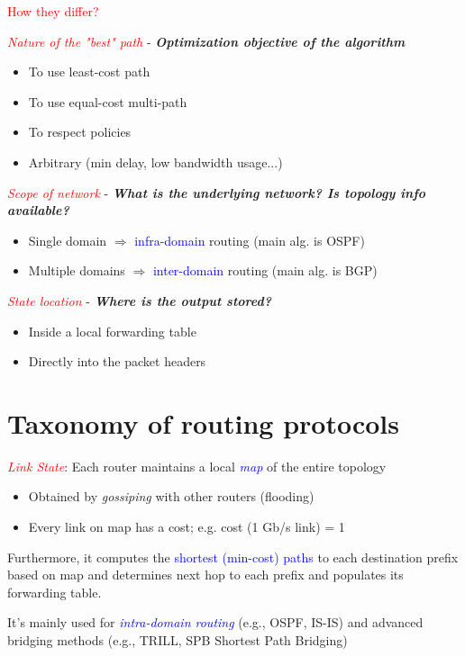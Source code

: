 \documentclass[11pt]{article}
\begin{document}
\textcolor{red}{How they differ?}

\textcolor{red}{\textit{Nature of the "best" path}} - \textbf{\textit{Optimization objective of the algorithm}}
\begin{itemize}
	\item To use least-cost path
	\item To use equal-cost multi-path
	\item To respect policies
	\item Arbitrary (min delay, low bandwidth usage...)
\end{itemize}

\textcolor{red}{\textit{Scope of network}} - \textbf{\textit{What is the  underlying network? Is topology info available?}}
\begin{itemize}
	\item Single domain $\Rightarrow$ \textcolor{blue}{infra-domain} routing (main alg. is OSPF)
	\item Multiple domains $\Rightarrow$ \textcolor{blue}{inter-domain} routing (main alg. is BGP)
\end{itemize}

\textcolor{red}{\textit{State location}} - \textbf{\textit{Where is the output stored?}}
\begin{itemize}
	\item Inside a local forwarding table
	\item Directly into the packet headers
\end{itemize}

\section*{Taxonomy of routing protocols}

\textcolor{red}{\textit{Link State}}: Each router maintains a local \textcolor{blue}{\textit{map}} of the entire topology
\begin{itemize}
	\item Obtained by \textit{gossiping} with other routers (flooding)
	\item Every link on map has a cost; e.g. cost (1 Gb/s link) = 1
\end{itemize}
Furthermore, it computes the \textcolor{blue}{shortest (min-cost) paths} to each destination prefix based on map and determines next hop to each prefix and populates its forwarding table. 

It's mainly used for \textit{\textcolor{blue}{intra-domain routing}} (e.g., OSPF, IS-IS) and advanced bridging methods (e.g., TRILL, SPB Shortest Path Bridging)
\end{document}
